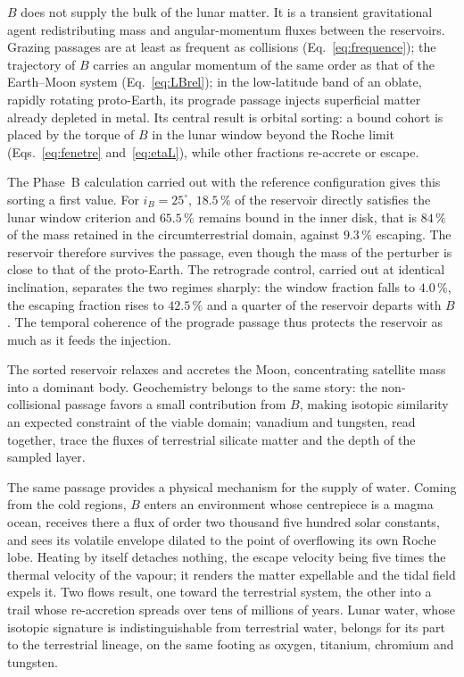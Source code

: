 \documentclass[11pt,a4paper,openany]{report}
\begin{document}
$B$ does not supply the bulk of the lunar matter. It is a transient gravitational
agent redistributing mass and angular-momentum fluxes between the reservoirs. Grazing passages are
at least as frequent as collisions (Eq.~\eqref{eq:frequence}); the trajectory of $B$ carries an
angular momentum of the same order as that of the Earth--Moon system (Eq.~\eqref{eq:LBrel}); in the
low-latitude band of an oblate, rapidly rotating proto-Earth, its prograde passage injects
superficial matter already depleted in metal. Its central result is orbital sorting: a bound cohort
is placed by the torque of $B$ in the lunar window beyond the Roche limit (Eqs.~\eqref{eq:fenetre}
and~\eqref{eq:etaL}), while other fractions re-accrete or escape.

The Phase~B calculation carried out with the reference configuration gives this sorting a first
value. For $i_B=25^\circ$, $18.5\,\%$ of the reservoir directly satisfies the lunar window criterion
and $65.5\,\%$ remains bound in the inner disk, that is $84\,\%$ of the mass retained in the
circumterrestrial domain, against $9.3\,\%$ escaping. The reservoir therefore survives the passage,
even though the mass of the perturber is close to that of the proto-Earth. The retrograde control,
carried out at identical inclination, separates the two regimes sharply: the window fraction falls to
$4.0\,\%$, the escaping fraction rises to $42.5\,\%$ and a quarter of the reservoir departs with $B$.
The temporal coherence of the prograde passage thus protects the reservoir as much as it feeds the
injection.

The sorted reservoir relaxes and accretes the Moon, concentrating satellite mass into a dominant
body. Geochemistry belongs to the same story: the non-collisional passage favors a small
contribution from $B$, making isotopic similarity an expected constraint of the viable domain;
vanadium and tungsten, read together, trace the fluxes of terrestrial silicate matter and the depth
of the sampled layer.

The same passage provides a physical mechanism for the supply of water. Coming from the cold regions, $B$ enters an environment
whose centrepiece is a magma ocean, receives there a flux of order two thousand five hundred solar
constants, and sees its volatile envelope dilated to the point of overflowing its own Roche lobe.
Heating by itself detaches nothing, the escape velocity being five times the thermal velocity of the
vapour; it renders the matter expellable and the tidal field expels it. Two flows result, one toward
the terrestrial system, the other into a trail whose re-accretion spreads over tens of millions of
years. Lunar water, whose isotopic signature is indistinguishable from terrestrial water, belongs for
its part to the terrestrial lineage, on the same footing as oxygen, titanium, chromium and tungsten.
\end{document}
